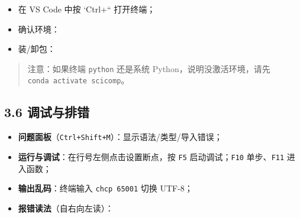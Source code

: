 \begin{itemize}
\tightlist
\item
  在 VS Code 中按 `Ctrl+`` 打开终端；
\item
  确认环境：
\end{itemize}

\begin{Shaded}
\begin{Highlighting}[]
\end{Highlighting}
\end{Shaded}

\begin{itemize}
\tightlist
\item
  装/卸包：
\end{itemize}

\begin{Shaded}
\begin{Highlighting}[]
\OperatorTok{{-}}
\end{Highlighting}
\end{Shaded}

\begin{quote}
注意：如果终端 \texttt{python} 还是系统 Python，说明没激活环境，请先
\texttt{conda\ activate\ scicomp}。
\end{quote}

\subsection{3.6 调试与排错}\label{ux8c03ux8bd5ux4e0eux6392ux9519}

\begin{itemize}
\tightlist
\item
  \textbf{问题面板}（\texttt{Ctrl+Shift+M}）：显示语法/类型/导入错误；
\item
  \textbf{运行与调试}：在行号左侧点击设置断点，按 \texttt{F5}
  启动调试；\texttt{F10} 单步、\texttt{F11} 进入函数；
\item
  \textbf{输出乱码}：终端输入 \texttt{chcp\ 65001} 切换 UTF-8；
\item
  \textbf{报错读法}（自右向左读）：
\end{itemize}

\begin{Shaded}
\begin{Highlighting}[]
\end{Highlighting}
\end{Shaded}

